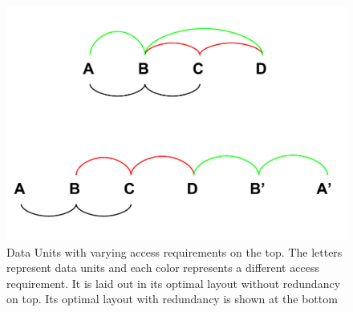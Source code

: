 \begin{figure}[h!]
\centering
\includegraphics[width=\columnwidth]{DataLayoutPaper_TheoryLayouts.pdf}
\caption{Data Units with varying access requirements on the top. The letters represent data units and each color represents a different access requirement. It is laid out in its optimal layout without redundancy on top. Its optimal layout with redundancy is shown at the bottom}
\label{fig:startingProb}
\end{figure}

